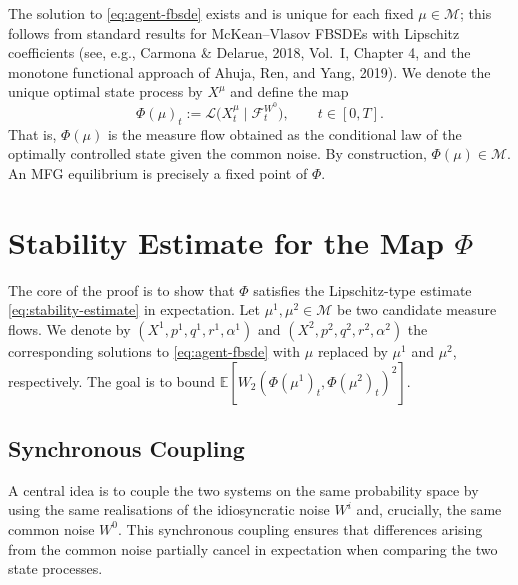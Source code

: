 The solution to \eqref{eq:agent-fbsde} exists and is unique for each fixed
$\mu \in \mathcal{M}$; this follows from standard results for McKean--Vlasov FBSDEs
with Lipschitz coefficients (see, e.g., Carmona \& Delarue, 2018, Vol.\ I, Chapter 4,
and the monotone functional approach of Ahuja, Ren, and Yang, 2019). We denote the
unique optimal state process by $X^\mu$ and define the map
\begin{equation}
    \Phi(\mu)_t := \mathcal{L}\big(X_t^\mu \mid \mathcal{F}_t^{W^0}\big), \qquad
    t \in [0,T].
    \label{eq:fixed-point-map}
\end{equation}
That is, $\Phi(\mu)$ is the measure flow obtained as the conditional law of the
optimally controlled state given the common noise. By construction,
$\Phi(\mu) \in \mathcal{M}$. An MFG equilibrium is precisely a fixed point of $\Phi$.


\section{Stability Estimate for the Map $\Phi$}
\label{sec:wp-stability}

The core of the proof is to show that $\Phi$ satisfies the Lipschitz-type estimate
\eqref{eq:stability-estimate} in expectation. Let $\mu^1, \mu^2 \in \mathcal{M}$ be two
candidate measure flows. We denote by $(X^1, p^1, q^1, r^1, \alpha^1)$ and
$(X^2, p^2, q^2, r^2, \alpha^2)$ the corresponding solutions to \eqref{eq:agent-fbsde}
with $\mu$ replaced by $\mu^1$ and $\mu^2$, respectively. The goal is to bound
$\mathbb{E}[W_2(\Phi(\mu^1)_t, \Phi(\mu^2)_t)^2]$.

\subsection{Synchronous Coupling}

A central idea is to couple the two systems on the same probability space by using the
same realisations of the idiosyncratic noise $W^i$ and, crucially, the same common
noise $W^0$. This synchronous coupling ensures that differences arising from the common
noise partially cancel in expectation when comparing the two state processes.

